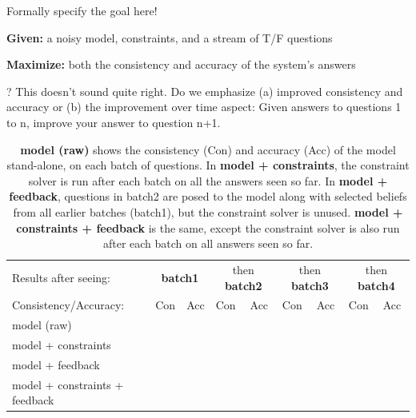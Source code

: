 \documentclass[11pt]{article}
\newenvironment{des}{                 %
     \parskip 0cm \begin{list}{}{\parsep 0cm \itemsep 0cm \topsep 0cm}}{
       \end{list}} %
\begin{document}
Formally specify the goal here!

\begin{des}
\item[{\bf Given:}] a noisy model, constraints, and a stream of T/F questions
\item[{\bf Maximize:}] both the consistency and accuracy of the system's answers
\end{des}
? This doesn't sound quite right. Do we emphasize (a) improved consistency and
accuracy or (b) the improvement over time aspect: Given answers to questions
1 to n, improve your answer to question n+1. 







\begin{table}
\centering
{\small
\begin{tabular}{|l|ll||ll||ll||ll|} \hline
Results after seeing: & \multicolumn{2}{|c|}{\bf batch1} &
\multicolumn{2}{|c|}{then {\bf batch2}} &
\multicolumn{2}{|c|}{then {\bf batch3}} &
\multicolumn{2}{|c|}{then {\bf batch4}} \\
Consistency/Accuracy: & Con & Acc & Con & Acc & Con & Acc & Con & Acc \\ \hline           
model (raw) & & & & & & & & \\
model + constraints & & & & & & & & \\
model + feedback & & & & & & & & \\
model + constraints + feedback & & & & & & & & \\ \hline
\end{tabular}
}
\caption{{\bf model (raw)} shows the consistency (Con) and accuracy (Acc) of the
model stand-alone, on each batch of questions. 
 In {\bf model + constraints}, the constraint solver is run
 after each batch on all the answers seen so far. In {\bf model + feedback},
 questions in batch2 are posed to the model along with selected beliefs from
 all earlier batches (batch1), but the constraint solver is unused. 
 {\bf model + constraints + feedback} is the same, except the constraint solver is also run
 after each batch on all answers seen so far.
\label{incremental-improvement}}
\end{table}
\end{document}
